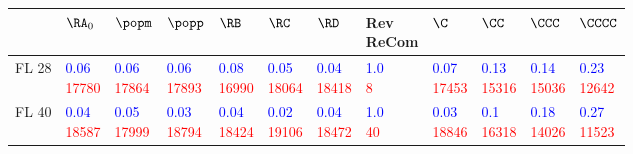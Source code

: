 \begin{tabular}{llllllllllll}
\toprule
{} &                                                      $\RA_0$ &                                                      $\popm$ &                                                      $\popp$ &                                                        $\RB$ &                                                        $\RC$ &                                                        $\RD$ &                                    \makecell{Rev \\ ReCom} &                                                         $\C$ &                                                        $\CC$ &                                                       $\CCC$ &                                                      $\CCCC$ \\
\midrule
FL 28  &  \makecell{\textcolor{blue}{0.06} \\ \textcolor{red}{17780}} &  \makecell{\textcolor{blue}{0.06} \\ \textcolor{red}{17864}} &  \makecell{\textcolor{blue}{0.06} \\ \textcolor{red}{17893}} &  \makecell{\textcolor{blue}{0.08} \\ \textcolor{red}{16990}} &  \makecell{\textcolor{blue}{0.05} \\ \textcolor{red}{18064}} &  \makecell{\textcolor{blue}{0.04} \\ \textcolor{red}{18418}} &     \makecell{\textcolor{blue}{1.0} \\ \textcolor{red}{8}} &  \makecell{\textcolor{blue}{0.07} \\ \textcolor{red}{17453}} &  \makecell{\textcolor{blue}{0.13} \\ \textcolor{red}{15316}} &  \makecell{\textcolor{blue}{0.14} \\ \textcolor{red}{15036}} &  \makecell{\textcolor{blue}{0.23} \\ \textcolor{red}{12642}} \\
FL 40  &  \makecell{\textcolor{blue}{0.04} \\ \textcolor{red}{18587}} &  \makecell{\textcolor{blue}{0.05} \\ \textcolor{red}{17999}} &  \makecell{\textcolor{blue}{0.03} \\ \textcolor{red}{18794}} &  \makecell{\textcolor{blue}{0.04} \\ \textcolor{red}{18424}} &  \makecell{\textcolor{blue}{0.02} \\ \textcolor{red}{19106}} &  \makecell{\textcolor{blue}{0.04} \\ \textcolor{red}{18472}} &    \makecell{\textcolor{blue}{1.0} \\ \textcolor{red}{40}} &  \makecell{\textcolor{blue}{0.03} \\ \textcolor{red}{18846}} &   \makecell{\textcolor{blue}{0.1} \\ \textcolor{red}{16318}} &  \makecell{\textcolor{blue}{0.18} \\ \textcolor{red}{14026}} &  \makecell{\textcolor{blue}{0.27} \\ \textcolor{red}{11523}} \\

\end{tabular}
